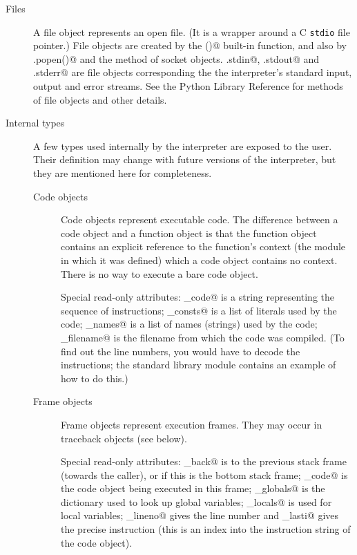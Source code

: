 \begin{description}
\item[Files]
A file object represents an open file.  (It is a wrapper around a C
{\tt stdio} file pointer.)  File objects are created by the
\verb@open()@ built-in function, and also by \verb@posix.popen()@ and
the \verb@makefile@ method of socket objects.  \verb@sys.stdin@,
\verb@sys.stdout@ and \verb@sys.stderr@ are file objects corresponding
the the interpreter's standard input, output and error streams.
See the Python Library Reference for methods of file objects and other
details.

\item[Internal types]
A few types used internally by the interpreter are exposed to the user.
Their definition may change with future versions of the interpreter,
but they are mentioned here for completeness.

\begin{description}

\item[Code objects]
Code objects represent executable code.  The difference between a code
object and a function object is that the function object contains an
explicit reference to the function's context (the module in which it
was defined) which a code object contains no context.  There is no way
to execute a bare code object.

Special read-only attributes: \verb@co_code@ is a string representing
the sequence of instructions; \verb@co_consts@ is a list of literals
used by the code; \verb@co_names@ is a list of names (strings) used by
the code; \verb@co_filename@ is the filename from which the code was
compiled.  (To find out the line numbers, you would have to decode the
instructions; the standard library module \verb@dis@ contains an
example of how to do this.)

\item[Frame objects]
Frame objects represent execution frames.  They may occur in traceback
objects (see below).

Special read-only attributes: \verb@f_back@ is to the previous
stack frame (towards the caller), or \verb@None@ if this is the bottom
stack frame; \verb@f_code@ is the code object being executed in this
frame; \verb@f_globals@ is the dictionary used to look up global
variables; \verb@f_locals@ is used for local variables;
\verb@f_lineno@ gives the line number and \verb@f_lasti@ gives the
precise instruction (this is an index into the instruction string of
the code object).


\end{description}
\end{description}
